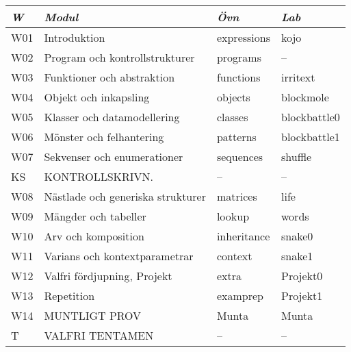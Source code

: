 \begin{tabular}{l|l|l|l}
\textit{W} & \textit{Modul} & \textit{Övn} & \textit{Lab} \\ \hline \hline
W01 & Introduktion & expressions & kojo \\
W02 & Program och kontrollstrukturer & programs & -- \\
W03 & Funktioner och abstraktion & functions & irritext \\
W04 & Objekt och inkapsling & objects & blockmole \\
W05 & Klasser och datamodellering & classes & blockbattle0 \\
W06 & Mönster och felhantering & patterns & blockbattle1 \\
W07 & Sekvenser och enumerationer & sequences & shuffle \\
KS & KONTROLLSKRIVN. & -- & -- \\
W08 & Nästlade och generiska strukturer & matrices & life \\
W09 & Mängder och tabeller & lookup & words \\
W10 & Arv och komposition & inheritance & snake0 \\
W11 & Varians och kontextparametrar & context & snake1 \\
W12 & Valfri fördjupning, Projekt & extra & Projekt0 \\
W13 & Repetition & examprep & Projekt1 \\
W14 & MUNTLIGT PROV & Munta & Munta \\
T & VALFRI TENTAMEN & -- & -- \\
\end{tabular}
